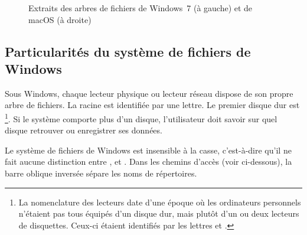 \begin{figure}
  \begin{minipage}[t]{0.45\linewidth}
  \end{minipage}
  \hfill
  \begin{minipage}[t]{0.45\linewidth}
  \end{minipage}
  \caption[Extraits de la hiérarchie des systèmes de fichiers]{%
    Extraits des arbres de fichiers de Windows~7 (à gauche) et de
    macOS (à droite)}
  \label{fig:informatique:fs}
\end{figure}

\subsection{Particularités du système de fichiers de Windows}
\label{sec:informatique:fs:windows}

Sous Windows, chaque lecteur physique ou lecteur réseau dispose de son
propre arbre de fichiers. La racine est identifiée par une lettre. Le
premier disque dur est \footnote{%
  La nomenclature des lecteurs date d'une époque où les ordinateurs
  personnels n'étaient pas tous équipés d'un disque dur, mais plutôt
  d'un ou deux lecteurs de disquettes. Ceux-ci étaient identifiés par
  les lettres  et .}. %
Si le système comporte plus d'un disque, l'utilisateur doit savoir sur
quel disque retrouver ou enregistrer ses données.

Le système de fichiers de Windows est insensible à la casse,
c'est-à-dire qu'il ne fait aucune distinction entre ,  et . Dans les
chemins d'accès (voir ci-dessous), la barre oblique inversée
{\bs} sépare les noms de répertoires.

